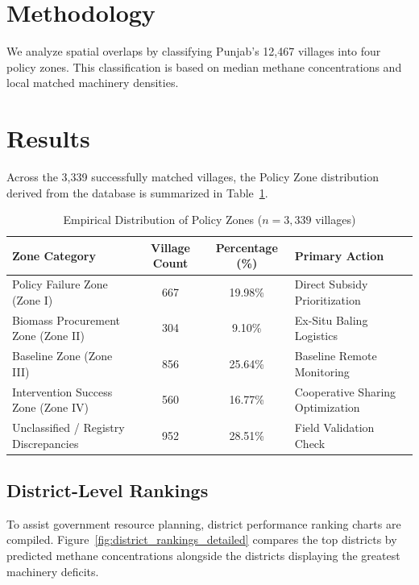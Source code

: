 \documentclass[12pt,a4paper]{report}
\begin{document}
\section{Methodology}
We analyze spatial overlaps by classifying Punjab's 12,467 villages into four policy zones. This classification is based on median methane concentrations and local matched machinery densities.

\section{Results}
Across the 3,339 successfully matched villages, the Policy Zone distribution derived from the database is summarized in Table~\ref{tab:policy_zones_detailed_tab}.

\begin{table}[H]
\centering
\caption{Empirical Distribution of Policy Zones ($n=3,339$ villages)}
\label{tab:policy_zones_detailed_tab}
\begin{tabular}{lccl}
\toprule
\textbf{Zone Category} & \textbf{Village Count} & \textbf{Percentage (\%)} & \textbf{Primary Action} \\
\midrule
Policy Failure Zone (Zone I) & 667 & 19.98\% & Direct Subsidy Prioritization \\
Biomass Procurement Zone (Zone II) & 304 & 9.10\% & Ex-Situ Baling Logistics \\
Baseline Zone (Zone III) & 856 & 25.64\% & Baseline Remote Monitoring \\
Intervention Success Zone (Zone IV) & 560 & 16.77\% & Cooperative Sharing Optimization \\
Unclassified / Registry Discrepancies & 952 & 28.51\% & Field Validation Check \\
\bottomrule
\end{tabular}
\end{table}

\subsection{District-Level Rankings}
To assist government resource planning, district performance ranking charts are compiled. Figure~\ref{fig:district_rankings_detailed} compares the top districts by predicted methane concentrations alongside the districts displaying the greatest machinery deficits.
\end{document}
